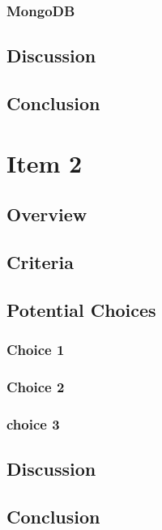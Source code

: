 \documentclass[letterpaper,10pt]{article}
\begin{document}
		\subsubsection{MongoDB}
		
	\subsection{Discussion}
	
	\subsection{Conclusion}
	
	
\section{Item 2}
		\subsection{Overview}
	
	\subsection{Criteria}
	
	\subsection{Potential Choices}
		\subsubsection{Choice 1}
		
		\subsubsection{Choice 2}
		
		\subsubsection{choice 3}
		
	\subsection{Discussion}
	
	\subsection{Conclusion}
	
\end{document}
